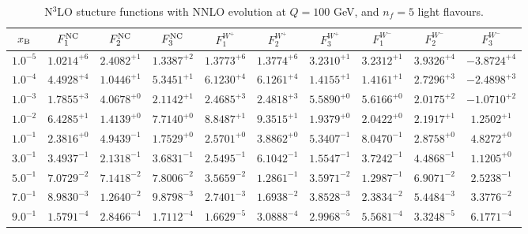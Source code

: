 \begin{table}[h]
\begin{adjustbox}{width=\textwidth}
\begin{tabular}{|c||c|c|c|c|c|c|c|c|c|}
\hline
$x_{\rm B}$ & $F_1^{\rm NC}$ & $F_2^{\rm NC}$ & $F_3^{\rm NC}$ & $F_1^{W^+}$ & $F_2^{W^+}$ & $F_3^{W^+}$ & $F_1^{W^-}$ & $F_2^{W^-}$ & $F_3^{W^-}$ \\
\hline
$ 1.0^{-5}$ & $ 1.0214^{+6}$ & $ 2.4082^{+1}$ & $ 1.3387^{+2}$ & $ 1.3773^{+6}$ & $ 1.3774^{+6}$ & $ 3.2310^{+1}$ & $ 3.2312^{+1}$ & $ 3.9326^{+4}$ & $-3.8724^{+4}$ \\
$ 1.0^{-4}$ & $ 4.4928^{+4}$ & $ 1.0446^{+1}$ & $ 5.3451^{+1}$ & $ 6.1230^{+4}$ & $ 6.1261^{+4}$ & $ 1.4155^{+1}$ & $ 1.4161^{+1}$ & $ 2.7296^{+3}$ & $-2.4898^{+3}$ \\
$ 1.0^{-3}$ & $ 1.7855^{+3}$ & $ 4.0678^{+0}$ & $ 2.1142^{+1}$ & $ 2.4685^{+3}$ & $ 2.4818^{+3}$ & $ 5.5890^{+0}$ & $ 5.6166^{+0}$ & $ 2.0175^{+2}$ & $-1.0710^{+2}$ \\
$ 1.0^{-2}$ & $ 6.4285^{+1}$ & $ 1.4139^{+0}$ & $ 7.7140^{+0}$ & $ 8.8487^{+1}$ & $ 9.3515^{+1}$ & $ 1.9379^{+0}$ & $ 2.0422^{+0}$ & $ 2.1917^{+1}$ & $ 1.2502^{+1}$ \\
$ 1.0^{-1}$ & $ 2.3816^{+0}$ & $ 4.9439^{-1}$ & $ 1.7529^{+0}$ & $ 2.5701^{+0}$ & $ 3.8862^{+0}$ & $ 5.3407^{-1}$ & $ 8.0470^{-1}$ & $ 2.8758^{+0}$ & $ 4.8272^{+0}$ \\
$ 3.0^{-1}$ & $ 3.4937^{-1}$ & $ 2.1318^{-1}$ & $ 3.6831^{-1}$ & $ 2.5495^{-1}$ & $ 6.1042^{-1}$ & $ 1.5547^{-1}$ & $ 3.7242^{-1}$ & $ 4.4868^{-1}$ & $ 1.1205^{+0}$ \\
$ 5.0^{-1}$ & $ 7.0729^{-2}$ & $ 7.1418^{-2}$ & $ 7.8006^{-2}$ & $ 3.5659^{-2}$ & $ 1.2861^{-1}$ & $ 3.5971^{-2}$ & $ 1.2987^{-1}$ & $ 6.9071^{-2}$ & $ 2.5238^{-1}$ \\
$ 7.0^{-1}$ & $ 8.9830^{-3}$ & $ 1.2640^{-2}$ & $ 9.8798^{-3}$ & $ 2.7401^{-3}$ & $ 1.6938^{-2}$ & $ 3.8528^{-3}$ & $ 2.3834^{-2}$ & $ 5.4484^{-3}$ & $ 3.3776^{-2}$ \\
$ 9.0^{-1}$ & $ 1.5791^{-4}$ & $ 2.8466^{-4}$ & $ 1.7112^{-4}$ & $ 1.6629^{-5}$ & $ 3.0888^{-4}$ & $ 2.9968^{-5}$ & $ 5.5681^{-4}$ & $ 3.3248^{-5}$ & $ 6.1771^{-4}$ \\
\hline
\end{tabular}
\end{adjustbox}\caption{N$^{3}$LO stucture functions with NNLO evolution at $Q = 100$ GeV, and $n_f=5$ light flavours.}
\label{tab:N3LO-Q100}
\end{table}


